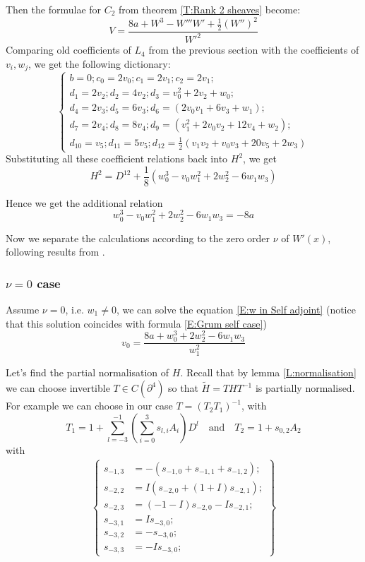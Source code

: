 \documentclass[11pt]{article}
\theoremstyle{definition}
\theoremstyle{plain}
\numberwithin{equation}{section}
\begin{document}
Then the  formulae for $C_2$ from theorem \ref{T:Rank 2 sheaves} become:
\begin{equation}
	\label{E:Grum self case}
V=\frac{8a+W^3-W'''W'+\frac{1}{2}(W'')^2}{W'^2}
\end{equation}
Comparing old coefficients of $L_4$ from the previous section with the coefficients of $v_i,w_j$,  we get the following dictionary:
$$
\begin{cases}
b = 0;c_0 = 2 v_0; c_1 = 2 v_1;c_2 = 2 v_1;
\\ d_1 = 2 v_2; d_2 = 4 v_2; d_3 = v_0^2 + 2 v_2 + w_0;
\\ d_4 = 2 v_3;d_5 = 6 v_3; d_6 = (2 v_0 v_1 + 6 v_3 + w_1) ;
\\ d_7 = 2 v_4; d_8 = 8 v_4;d_9 = (v_1^2 + 2 v_0 v_2 + 12 v_4 + w_2);
\\ d_{10}= v_5;d_{11}=5v_5;d_{12}=\frac{1}{2} (v_1v_2+v_0v_3+20v_5+2 w_3)
\end{cases}
$$
Substituting all these coefficient relations back into $H^2$, we get
$$
H^2=D^{12}+\frac{1}{8}(w_0^3 - v_0 w_1^2 + 2 w_2^2 - 6 w_1 w_3)
$$ 

Hence we get the additional relation 
\begin{equation}
	\label{E:w in Self adjoint}
w_0^3 -  v_0 w_1^2 + 2 w_2^2 - 6 w_1 w_3=-8a
\end{equation}

Now we separate the calculations according to the zero order $\nu$ of $W'(x)$, following results from \cite{BZ}.

\subsubsection{$\nu=0$ case}
\label{S:nu0case}

Assume $\nu=0$, i.e. $w_1\neq 0$, we can solve the equation \eqref{E:w in Self adjoint} (notice that this solution coincides with formula \eqref{E:Grum self case})
$$v_0=\frac{8 a+w_0^3+2 w_2^2-6 w_1 w_3}{w_1^2}$$

Let's find the partial normalisation of $H$. Recall that by lemma \ref{L:normalisation}  we can choose invertible $T\in C(\partial^4)$ so that $\tilde{H}=THT^{-1}$ is partially normalised. For example we can choose in our case  $T=(T_2T_1)^{-1}$, with
\begin{equation}
	\label{E:T12}
T_1=1+\sum_{l=-3}^{-1}(\sum_{i=0}^3s_{l,i}A_i)D^l \quad \text{and} \quad T_2=1+s_{0,2}A_2
\end{equation}
with 
\begin{align}
	\label{E:T1 invertible}
\left\{\begin{aligned}
	s_{-1,3}&=-(s_{-1,0}+s_{-1,1}+s_{-1,2});
	\\s_{-2, 2}& = I (s_{-2, 0} + (1 + I) s_{-2, 1}); 
	\\s_{-2, 3} &= (-1 - I) s_{-2, 0} - I s_{-2, 1};
	\\s_{-3,1}&=I s_{-3,0};
	\\s_{-3,2}&=-s_{-3,0};
	\\s_{-3,3}&=-I s_{-3,0};
\end{aligned}\right\}
\end{align}
\end{document}
